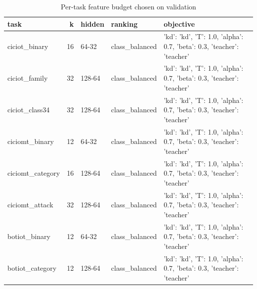 \begin{table}
\caption{Per-task feature budget chosen on validation}
\begin{tabular}{lrlll}
\toprule
task & k & hidden & ranking & objective \\
\midrule
ciciot_binary & 16 & 64-32 & class_balanced & {'kd': 'kd', 'T': 1.0, 'alpha': 0.7, 'beta': 0.3, 'teacher': 'teacher'} \\
ciciot_family & 32 & 128-64 & class_balanced & {'kd': 'kd', 'T': 1.0, 'alpha': 0.7, 'beta': 0.3, 'teacher': 'teacher'} \\
ciciot_class34 & 32 & 128-64 & class_balanced & {'kd': 'kd', 'T': 1.0, 'alpha': 0.7, 'beta': 0.3, 'teacher': 'teacher'} \\
ciciomt_binary & 12 & 64-32 & class_balanced & {'kd': 'kd', 'T': 1.0, 'alpha': 0.7, 'beta': 0.3, 'teacher': 'teacher'} \\
ciciomt_category & 16 & 128-64 & class_balanced & {'kd': 'kd', 'T': 1.0, 'alpha': 0.7, 'beta': 0.3, 'teacher': 'teacher'} \\
ciciomt_attack & 32 & 128-64 & class_balanced & {'kd': 'kd', 'T': 1.0, 'alpha': 0.7, 'beta': 0.3, 'teacher': 'teacher'} \\
botiot_binary & 12 & 64-32 & class_balanced & {'kd': 'kd', 'T': 1.0, 'alpha': 0.7, 'beta': 0.3, 'teacher': 'teacher'} \\
botiot_category & 12 & 128-64 & class_balanced & {'kd': 'kd', 'T': 1.0, 'alpha': 0.7, 'beta': 0.3, 'teacher': 'teacher'} \\
\bottomrule
\end{tabular}
\end{table}
